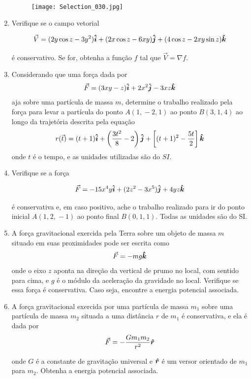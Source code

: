 \documentclass[11pt,a4paper]{article}
\newcommand{\mat}[1]{\mbox{\boldmath{$#1$}}}
\begin{document}
\begin{enumerate}
\begin{figure}[h]	
\centering %
\texttt{[image: Selection\_030.jpg]} 
\end{figure}

\item Verifique se o campo vetorial

$$\vec{V} = (2y \cos z - 3y^2)\mat{\hat{i}} + (2x\cos z - 6xy)\mat{\hat{j}} + (4\cos z - 2xy \sin z)\mat{\hat{k}}$$

é conservativo. Se for, obtenha a função $f$ tal que $\vec{V} = \nabla f$.

\item Considerando que uma força dada por
$$\vec{F} = (3xy - z)\mat{\hat{i}} + 2x^2\mat{\hat{j}} - 3xz\mat{\hat{k}}$$
aja sobre uma partícula de massa $m$, determine o trabalho realizado pela força para levar a partícula do ponto $A(1 \textrm{,}\ -2 \textrm{,}\ 1)$ ao ponto $B(3 \textrm{,}\ 1 \textrm{,}\ 4)$ ao longo da trajetória descrita pela equação
$$r(\vec{t}) = (t + 1)\mat{\hat{i}} + \left(\dfrac{3t^2}{8} - 2 \right)\mat{\hat{j}} + \left[(t + 1)^2 - \dfrac{5t}{2} \right]\mat{\hat{k}}$$
onde $t$ é o tempo, e as unidades utilizadas são do $SI$.

\item Verifique se a força

$$\vec{F} = -15x^4y\mat{\hat{i}} + (2z^2 - 3x^5)\mat{\hat{j}} + 4yz\mat{\hat{k}}$$

é conservativa e, em caso positivo, ache o trabalho realizado para ir do ponto inicial $A(1 \textrm{,}\ 2 \textrm{,}\ -1)$ ao ponto final $B(0 \textrm{,}\ 1 \textrm{,}\ 1)$. Todas as unidades são do SI.

\item A força gravitacional exercida pela Terra sobre um objeto de massa $m$ situado em suas proximidades pode ser escrita como 
$$\vec{F} = - mg \mat{\hat{k}}$$
onde o eixo $z$ aponta na direção da vertical de prumo no local, com sentido para cima, e $g$ é o módulo da aceleração da gravidade no local. Verifique se essa força é conservativa. Caso seja, encontre a energia potencial associada.

\item A força gravitacional exercida por uma partícula de massa $m_1$ sobre uma partícula de massa $m_2$ situada a uma distância $r$ de $m_1$ é conservativa, e ela é dada por
$$\vec{F} = - \displaystyle\dfrac{G m_1 m_2}{r^2} \mat{\hat{r}}$$

onde $G$ é a constante de gravitação universal e $\mat{\hat{r}}$ é um versor orientado de $m_1$ para $m_2$. Obtenha a energia potencial associada.


\end{enumerate}
\end{document}
